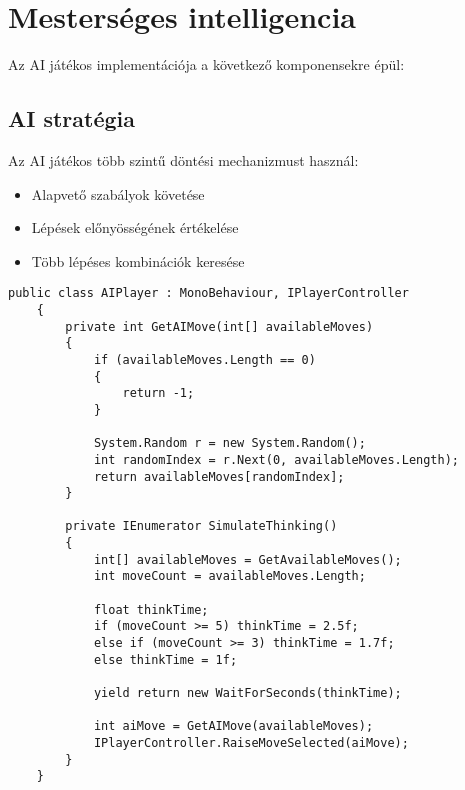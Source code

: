 \section{Mesterséges intelligencia}

Az AI játékos implementációja a következő komponensekre épül:

\subsection{AI stratégia}
Az AI játékos több szintű döntési mechanizmust használ:
\begin{itemize}
	\item Alapvető szabályok követése
	\item Lépések előnyösségének értékelése
	\item Több lépéses kombinációk keresése
\end{itemize}

\begin{lstlisting}[language={[Sharp]C}]
	public class AIPlayer : MonoBehaviour, IPlayerController
	{
		private int GetAIMove(int[] availableMoves)
		{
			if (availableMoves.Length == 0)
			{
				return -1;
			}
			
			System.Random r = new System.Random();
			int randomIndex = r.Next(0, availableMoves.Length);
			return availableMoves[randomIndex];
		}
		
		private IEnumerator SimulateThinking()
		{
			int[] availableMoves = GetAvailableMoves();
			int moveCount = availableMoves.Length;
			
			float thinkTime;
			if (moveCount >= 5) thinkTime = 2.5f;
			else if (moveCount >= 3) thinkTime = 1.7f;
			else thinkTime = 1f;
			
			yield return new WaitForSeconds(thinkTime);
			
			int aiMove = GetAIMove(availableMoves);
			IPlayerController.RaiseMoveSelected(aiMove);
		}
	}
\end{lstlisting}